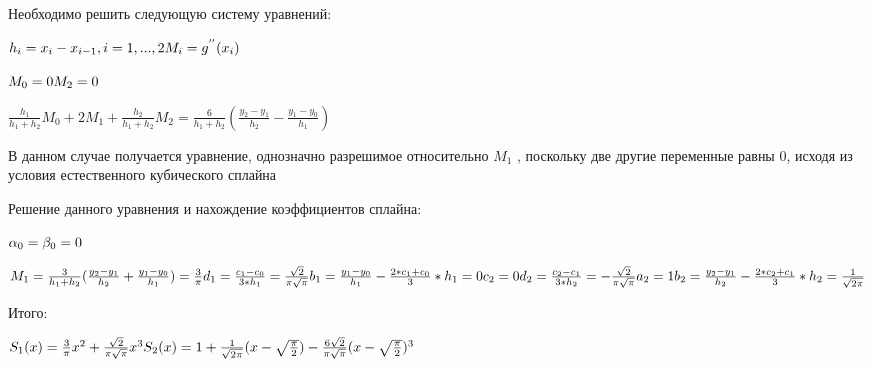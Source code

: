 Необходимо решить следующую систему уравнений:

\begin{math} 
	h_{i}=x_{i}-x_{i-1}, i=1,...,2 \\
	M_{i}=g^{''}(x_{i})
\end{math}

 \begin{math} 
	\\
	M_{0}=0 \\
	M_{2}=0\\
\end{math}

\begin{math}
		\frac{h_{1}}{h_{1}+h_{2}}M_{0}+2M_{1}+\frac{h_{2}}{h_{1}+h_{2}}M_{2}=\frac{6}{h_{1}+h_{2}}(\frac{y_{2}-y_{1}}{h_{2}}-\frac{y_{1}-y_{0}}{h_{1}})
\end{math}

В данном случае получается уравнение, однозначно разрешимое относительно \begin{math} 
	M_{1}
\end{math}
, поскольку две другие переменные равны 0, исходя из условия естественного кубического сплайна

Решение данного уравнения и нахождение коэффициентов сплайна: 

\begin{math} 
	\\
	\alpha_{0}=\beta_{0}=0
\end{math}

\begin{math} 
	\\
	M_{1}=\frac{3}{h_{1}+h_{2}}(\frac{y_{2}-y_{1}}{h_{2}}+\frac{y_{1}-y_{0}}{h_{1}})=\frac{3}{\pi} \\ 
	d_{1}=\frac{c_{1}-c_{0}}{3*h_{1}}=\frac{\sqrt{2}}{\pi\sqrt{\pi}} \\
	b_{1}=\frac{y_{1}-y_{0}}{h_{1}}-\frac{2*c_{1}+c_{0}}{3}*h_{1}=0 \\
	c_{2}=0 \\
	d_{2}=\frac{c_{2}-c_{1}}{3*h_{2}}=-\frac{\sqrt{2}}{\pi\sqrt{\pi}} \\
	a_{2}=1 \\
	b_{2}=\frac{y_{2}-y_{1}}{h_{2}}-\frac{2*c_{2}+c_{1}}{3}*h_{2}= \frac{1}{\sqrt{2\pi}} \\
\end{math}

Итого: 

\begin{math} 
	\\
	S_{1}(x)=\frac{3}{\pi}x^{2}+\frac{\sqrt{2}}{\pi\sqrt{\pi}}x^{3} \\
	S_{2}(x)=1+\frac{1}{\sqrt{2\pi}}(x-\sqrt{\frac{\pi}{2}})-\frac{6\sqrt{2}}{\pi\sqrt{\pi}}(x-\sqrt{\frac{\pi}{2}})^{3}
\end{math}

